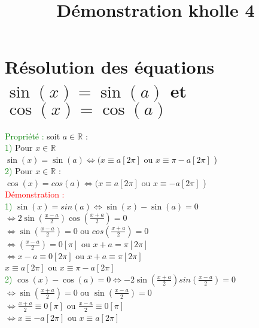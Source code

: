 \documentclass{article}
\begin{document}
\title{Démonstration kholle 4}
\date{}
\maketitle
	\renewcommand{\thesection}{\Roman{section}}
	\setlength{\parindent}{1.5cm}
	\section{Résolution des équations $\sin(x)=\sin(a)$ et $\cos(x) =\cos(a)$}
	\textcolor{green}{Propriété :} soit $a \in \mathbb{R}$ :\\
	\indent \textcolor{green}{1)} Pour $x \in \mathbb{R}$ \\
	\indent \indent $\sin(x)=\sin(a)\Leftrightarrow (x\equiv a[2 \pi ]$ ou $x \equiv \pi - a [2 \pi]$ ) \\
	\indent \textcolor{green}{2)} Pour $x \in \mathbb{R}$ : \\
	\indent \indent $\cos(x)=cos(a) \Leftrightarrow (x \equiv a [2 \pi]$ ou $x \equiv -a [2 \pi]$ ) \\
\textcolor{red}{Démonstration :} \\
 \textcolor{green}{1)} $\sin(x)=sin(a) \Leftrightarrow \sin(x) -\sin(a)=0$ \\
\indent \indent $\Leftrightarrow 2 \sin(\frac{x-a}{2})\cos(\frac{x+a}{2})=0$ \\
\indent \indent $\Leftrightarrow \sin(\frac{x-a}{2})=0$ ou $cos(\frac{x+a}{2})=0$ \\
\indent \indent $\Leftrightarrow(\frac{x-a}{2})=0[\pi]$ ou $x+a=\pi[2 \pi]$ \\
\indent \indent $\Leftrightarrow x-a \equiv 0[2\pi]$ ou $x+a \equiv \pi[2\pi]$ \\
\indent \indent $x \equiv a[2\pi]$ ou $x\equiv \pi-a[2\pi]$ \\
\textcolor{green}{2)} $\cos(x)-\cos(a)=0 \Leftrightarrow -2\sin(\frac{x+a}{2})sin(\frac{x-a}{2})=0$ \\
\indent \indent $\Leftrightarrow \sin(\frac{x+a}{2})=0$ ou $\sin(\frac{x-a}{2})=0$ \\
\indent \indent $\Leftrightarrow \frac{x+a}{2}\equiv 0 [\pi]$ ou $\frac{x-a}{2} \equiv 0[\pi]$ \\
\indent \indent $\Leftrightarrow x\equiv -a[2\pi]$ ou $x\equiv a [2\pi]$ \\
\end{document}
